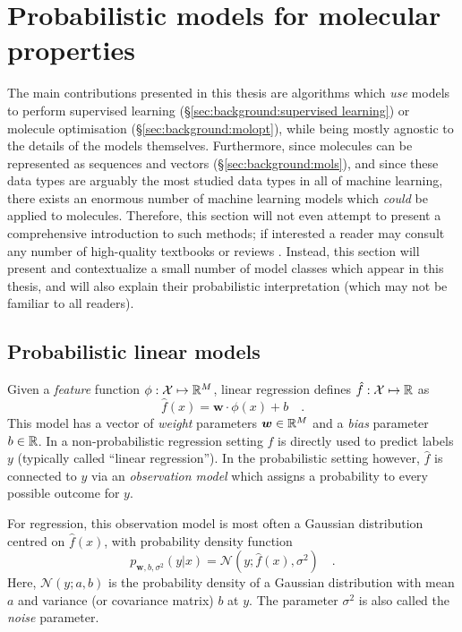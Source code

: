 \section{Probabilistic models for molecular properties}
\label{sec:background:models}

The main contributions presented in this thesis are algorithms which \emph{use}
models to perform supervised learning (\S\ref{sec:background:supervised learning})
or molecule optimisation (\S\ref{sec:background:molopt}),
while being mostly agnostic to the details of the models themselves.
Furthermore, since molecules can be represented as sequences and vectors (\S\ref{sec:background:mols}),
and since these data types are arguably the most studied data types in all of machine learning,
there exists an enormous number of machine learning models which \emph{could} be applied to molecules.
Therefore, this section will not even attempt to present a comprehensive introduction to such methods;
if interested a reader may consult any number of high-quality textbooks or reviews
\citep{bishop2006pattern,Goodfellow-et-al-2016deep-learning,murphy2022probabilistic}.
Instead, this section will present and contextualize a small number of model classes which appear in this thesis,
and will also explain their probabilistic interpretation (which may not be familiar to all readers).

\subsection{Probabilistic linear models}
\label{sec:background:linear models}

Given a \emph{feature} function $\phi:\mathcal X \mapsto \mathbb{R}^M$,
linear regression defines $\hat f: \mathcal X \mapsto \mathbb{R}$ as
\begin{equation}
    \hat f (x) = \bm{w} \cdot \phi (x) + b \quad .
\end{equation}
This model has a vector of \emph{weight} parameters $\bm{w}\in\mathbb{R}^M$
and a \emph{bias} parameter $b\in\mathbb{R}$.
In a non-probabilistic regression setting $\hat f$ is directly used to predict
labels $y$ (typically called ``linear regression'').
In the probabilistic setting however,
$\hat f$ is connected to $y$ via an \emph{observation model}
which assigns a probability to every possible outcome for $y$.

For regression, this observation model is most often
a Gaussian distribution centred on $\hat f(x)$,
with probability density function
\begin{equation}\label{eqn:background:gaussian noise}
    p_{\bm{w}, b, \sigma^2}(y|x) = \mathcal{N}(y; \hat f(x), \sigma^2)\quad .
\end{equation}
Here, $\mathcal N(y; a, b)$ is the probability density
of a Gaussian distribution with mean $a$
and variance (or covariance matrix) $b$ at $y$.
The parameter $\sigma^2$ is also called the \emph{noise} parameter.

